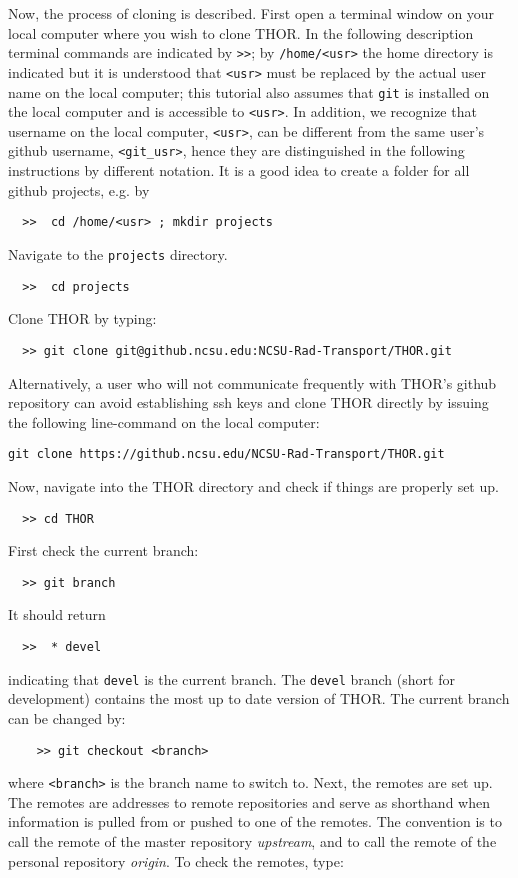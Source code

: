 Now, the process of cloning is described. First open a terminal window on your local computer where you wish to clone THOR.
In the following description terminal commands are indicated by \verb">>"; by \verb"/home/<usr>" the home directory is indicated but it is understood that \verb"<usr>" must be replaced by the actual user name on the local computer; this tutorial also assumes that \verb"git" is installed on the local computer and is accessible to \verb"<usr>". In addition, we recognize that username on the local computer, \verb"<usr>", can be different from the same user's github username, \verb"<git_usr>", hence they are distinguished in the following instructions by different notation.
It is a good idea to create a folder for all github projects, e.g. by
\begin{verbatim}
  >>  cd /home/<usr> ; mkdir projects
\end{verbatim}
Navigate to the \verb"projects" directory. 
\begin{verbatim}
  >>  cd projects
\end{verbatim}
Clone THOR by typing:
\begin{verbatim} 
  >> git clone git@github.ncsu.edu:NCSU-Rad-Transport/THOR.git
\end{verbatim}
Alternatively, a user who will not communicate frequently with THOR's github repository can avoid establishing ssh keys and clone THOR directly by issuing the following line-command on the local computer:
\begin{verbatim} 
git clone https://github.ncsu.edu/NCSU-Rad-Transport/THOR.git
\end{verbatim}
Now, navigate into the THOR directory and check if things are properly set up. 
\begin{verbatim} 
  >> cd THOR
\end{verbatim}
First check the current branch:
\begin{verbatim} 
  >> git branch
\end{verbatim}
It should return
\begin{verbatim}
  >>  * devel
\end{verbatim}
indicating that \verb"devel" is the current branch. The \verb"devel" branch (short for development) contains the most up to date version of THOR.
The current branch can be changed by:
\begin{verbatim}
    >> git checkout <branch>
\end{verbatim}
where \verb"<branch>" is the branch name to switch to.
Next, the remotes are set up. The remotes are addresses to remote repositories and serve as shorthand when information is pulled from or pushed to one of the remotes. The convention is to call the remote of the master repository \textit{upstream}, and to call the remote of the personal repository \textit{origin}. To check the remotes, type:
